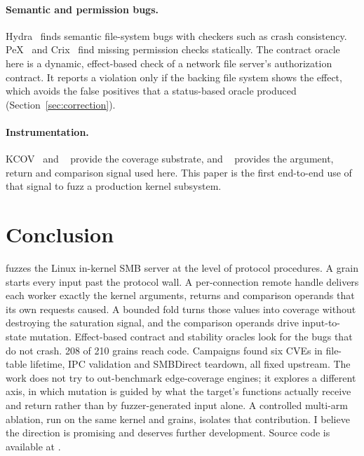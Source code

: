 \documentclass{article}
\begin{document}
\paragraph{Semantic and permission bugs.} Hydra~\cite{kim2019hydra} finds
semantic file-system bugs with checkers such as crash consistency.
PeX~\cite{zhang2019pex} and Crix~\cite{lu2019crix} find missing permission
checks statically. The contract oracle here is a dynamic, effect-based check
of a network file server's authorization contract. It reports a violation
only if the backing file system shows the effect, which avoids the false
positives that a status-based oracle produced (Section~\ref{sec:correction}).

\paragraph{Instrumentation.} KCOV~\cite{vyukov2016kcov} and \sancov~\cite{llvmsancov}
provide the coverage substrate, and \kcovdf~\cite{kim2026kcovdataflow}
provides the argument, return and comparison signal used here. This paper is
the first end-to-end use of that signal to fuzz a production kernel
subsystem.


\section{Conclusion}\label{sec:conclusion}

\toolname fuzzes the Linux in-kernel SMB server at the level of protocol
procedures. A grain starts every input past the protocol wall. A
per-connection remote handle delivers each worker exactly the kernel
arguments, returns and comparison operands that its own requests caused. A
bounded fold turns those values into coverage without destroying the
saturation signal, and the comparison operands drive input-to-state
mutation. Effect-based contract and stability oracles look for the bugs that
do not crash. 208 of 210 grains reach \ksmbd code. Campaigns found six CVEs in
file-table lifetime, IPC validation and SMBDirect teardown, all fixed
upstream. The work does not try to out-benchmark edge-coverage engines; it
explores a different axis, in which mutation is guided by what the target's
functions actually receive and return rather than by fuzzer-generated input
alone. A controlled multi-arm ablation, run on the same kernel and grains,
isolates that contribution. I believe the direction is promising and deserves
further development. Source code is available at \anonrepo{}.
\end{document}
